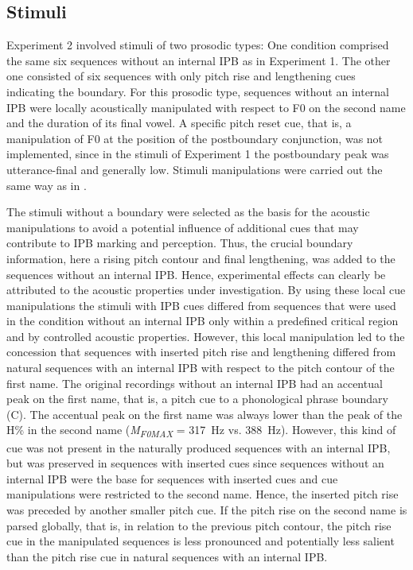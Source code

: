 \documentclass[output=paper]{langscibook}
\begin{document}
\subsection{Stimuli}
Experiment 2 involved stimuli of two prosodic types: One condition comprised the same six sequences without an internal IPB as in Experiment 1. The other one consisted of six sequences with only pitch rise and lengthening cues indicating the boundary. For this prosodic type, sequences without an internal IPB were locally acoustically manipulated with respect to F0 on the second name and the duration of its final vowel. A specific pitch reset cue, that is, a manipulation of F0 at the position of the postboundary conjunction, was not implemented, since in the stimuli of Experiment 1 the postboundary peak was utterance-final and generally low. Stimuli manipulations were carried out the same way as in \citet{Wellmann2012}.

The stimuli without a boundary were selected as the basis for the acoustic manipulations to avoid a potential influence of additional cues that may contribute to IPB marking and perception. Thus, the crucial boundary information, here a rising pitch contour and final lengthening, was added to the sequences without an internal IPB. Hence, experimental effects can clearly be attributed to the acoustic properties under investigation. By using these local cue manipulations the stimuli with IPB cues differed from sequences that were used in the condition without an internal IPB only within a predefined critical region and by controlled acoustic properties. However, this local manipulation led to the concession that sequences with inserted pitch rise and lengthening differed from natural sequences with an internal IPB with respect to the pitch contour of the first name. The original recordings without an internal IPB had an accentual peak on the first name, that is, a pitch cue to a phonological phrase boundary (C). The accentual peak on the first name was always lower than the peak of the H\% in the second name (\textit{M\textsubscript{F0MAX}} = \qty{317}{\hertz} vs. \qty{388}{\hertz}). However, this kind of cue was not present in the naturally produced sequences with an internal IPB, but was preserved in sequences with inserted cues since sequences without an internal IPB were the base for sequences with inserted cues and cue manipulations were restricted to the second name. Hence, the inserted pitch rise was preceded by another smaller pitch cue. If the pitch rise on the second name is parsed globally, that is, in relation to the previous pitch contour, the pitch rise cue in the manipulated sequences is less pronounced and potentially less salient than the pitch rise cue in natural sequences with an internal IPB.
\end{document}
